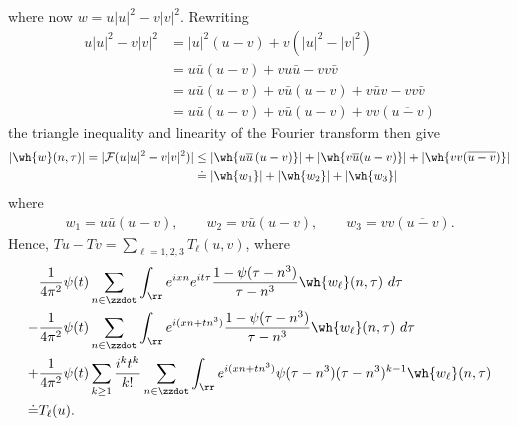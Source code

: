 %
where now $w = u | u |^2 - v | v |^{2}$. Rewriting
%
\begin{equation*}
	\begin{split}
		u | u |^{2} - v | v |^{2}
		& = | u |^2 \left( u -v \right) + v\left( | u 
		|^2 - | v |^2
		\right)
		\\
		& = u \bar u \left( u -v \right) + v u \bar u - v v \bar v
		\\
		& = u \bar u \left( u - v \right) + v \bar u\left( u - v \right) + v 
		\bar u v - v v \bar v
		\\
		& = u \bar u \left( u -v \right) + v \bar u\left( u - v \right) + v v 
		\left( \overline{u -v} \right)
	\end{split}
\end{equation*}
%
the triangle inequality and linearity of the Fourier transform then give
%
\begin{equation*}
	\begin{split}
		| \wh{w}(n, \tau) | = | \mathcal{F}(u | u |^2 - v| v |^2) |
		& \le | \wh{u \overline{u} \left (u -v \right )} | +
		| \wh{v \overline{u} (u -v)} | + |\wh{v v 
		(\overline{u-v})}|
		\\
		& \doteq | \wh{w_1} | + | \wh{w_2} | + | \wh{w_3} |
	\end{split}
\end{equation*}
%
where
%
\begin{equation*}
	\begin{split}
		w_1 = u \bar u \left( u -v \right), \qquad w_2 = v \bar u \left( u -v 
		\right), \qquad w_3 = v v \left( \overline{u -v} \right).
	\end{split}
\end{equation*}
%
Hence, $Tu - Tv = \sum_{\ell=1, 2, 3} 
T_\ell(u, v)$, where
\begin{align}
	\label{2main-int-exp-mod1}
	& \frac{1}{4 \pi^2} \psi(t) \sum_{n\in \zzdot} \int_\rr e^{ixn}  
		e^{it \tau} \frac{1 - \psi(\tau - n^{3}) 
		}{\tau - n^{3}} \wh{w_\ell}(n, \tau) \ d \tau
		\\
		\label{2main-int-exp-mod2}
		- & \frac{1}{4 \pi^2} \psi(t) \sum_{n\in \zzdot} \int_\rr e^{i(xn + 
		tn^{3})}
		 \frac{1- \psi(\tau - n^{3})}{\tau - n^{3}} \wh{w_\ell}(n, \tau) \ d \tau
		\\
		\label{2main-int-exp-mod3}
		+ & \frac{1}{4 \pi^2} \psi(t) \sum_{k \ge 1} \frac{i^k t^k}{k!}
		\sum_{n \in \zzdot} \int_\rr e^{i(xn + tn^{3} )}
		\psi(\tau - n^{3}) (\tau - n^{3})^{k-1} \wh{w_\ell}(n, \tau)  
		\\
		\doteq & T_\ell(u). \notag
\end{align}
